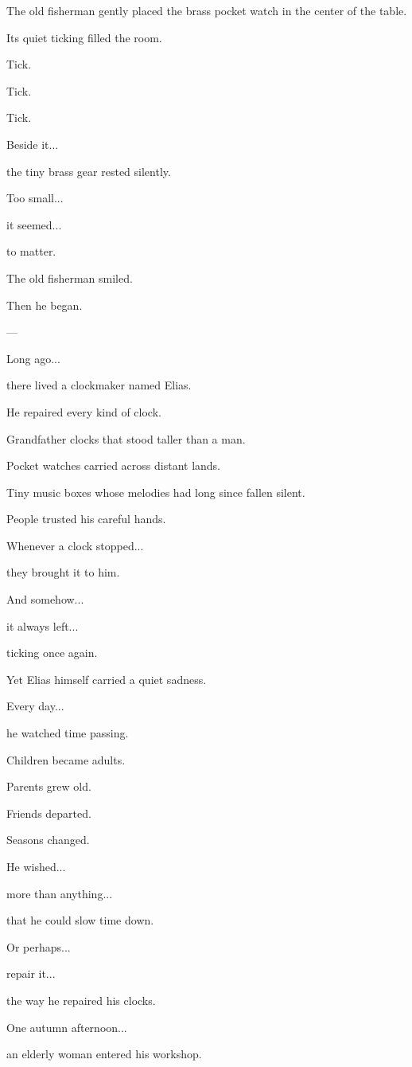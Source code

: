 \documentclass[12pt,openany]{book}
\begin{document}
The old fisherman gently placed the brass pocket watch in the center of the table.

Its quiet ticking filled the room.

Tick.

Tick.

Tick.

Beside it...

the tiny brass gear rested silently.

Too small...

it seemed...

to matter.

The old fisherman smiled.

Then he began.

---

Long ago...

there lived a clockmaker named Elias.

He repaired every kind of clock.

Grandfather clocks that stood taller than a man.

Pocket watches carried across distant lands.

Tiny music boxes whose melodies had long since fallen silent.

People trusted his careful hands.

Whenever a clock stopped...

they brought it to him.

And somehow...

it always left...

ticking once again.

Yet Elias himself carried a quiet sadness.

Every day...

he watched time passing.

Children became adults.

Parents grew old.

Friends departed.

Seasons changed.

He wished...

more than anything...

that he could slow time down.

Or perhaps...

repair it...

the way he repaired his clocks.

One autumn afternoon...

an elderly woman entered his workshop.
\end{document}
